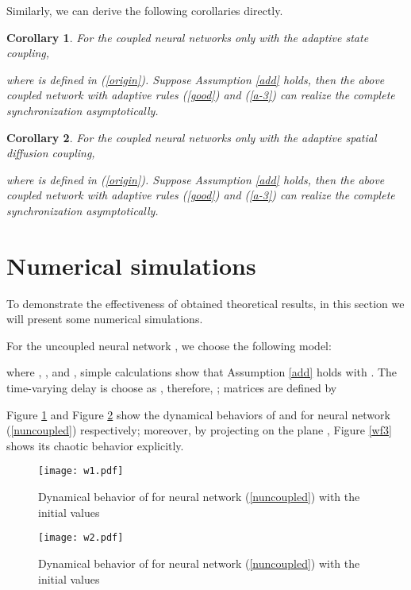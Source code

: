 \documentclass[review]{elsarticle}
\newtheorem{col}{Corollary}
\begin{document}
Similarly, we can derive the following corollaries directly.
\begin{col}
For the coupled neural networks only with the adaptive state coupling,

where  is defined in (\ref{origin}). Suppose Assumption \ref{add} holds, then the above coupled network with adaptive rules (\ref{good}) and (\ref{a-3}) can realize the complete synchronization asymptotically.
\end{col}

\begin{col}
For the coupled neural networks only with the adaptive spatial diffusion coupling,

where  is defined in (\ref{origin}). Suppose Assumption \ref{add} holds, then the above coupled network with adaptive rules (\ref{good}) and (\ref{a-3}) can realize the complete synchronization asymptotically.
\end{col}
\section{Numerical simulations}\label{nu}
To demonstrate the effectiveness of obtained theoretical results, in this section we will present some numerical simulations.

For the uncoupled neural network , we choose the following model:

where , , and , simple calculations show that Assumption \ref{add} holds with . The time-varying delay is choose as , therefore, ; matrices  are defined by

 Figure \ref{wf1} and Figure \ref{wf2} show the dynamical behaviors of  and  for neural network (\ref{nuncoupled}) respectively; moreover, by projecting on the plane , Figure \ref{wf3} shows its chaotic behavior explicitly.

\begin{figure}
\begin{center}
\texttt{[image: w1.pdf]}
\end{center}
\caption{Dynamical behavior of  for neural network (\ref{nuncoupled}) with the initial values }\label{wf1}
\end{figure}

\begin{figure}
\begin{center}
\texttt{[image: w2.pdf]}
\end{center}
\caption{Dynamical behavior of  for neural network (\ref{nuncoupled}) with the initial values }\label{wf2}
\end{figure}
\end{document}
